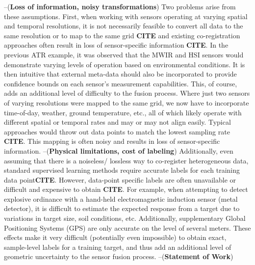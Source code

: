 \newline \vspace{1cm} \noindent --(\textbf{Loss of information, noisy transformations}) \newline
Two problems arise from these assumptions.  First, when working with sensors operating at varying spatial and temporal resolutions, it is not necessarily feasible to convert all data to the same resolution or to map to the same grid \textbf{CITE} and existing co-registration approaches often result in loss of sensor-specific information \textbf{CITE}.  In the previous ATR example, it was observed that the MWIR and HSI sensors would demonstrate varying levels of operation based on environmental conditions.  It is then intuitive that external meta-data should also be incorporated to provide confidence bounds on each sensor's measurement capabilities.  This, of course, adds an additional level of difficulty to the fusion process.  Where just two sensors of varying resolutions were mapped to the same grid, we now have to incorporate time-of-day, weather, ground temperature, etc., all of which likely operate with different spatial or temporal rates and may or may not align easily.  Typical approaches would throw out data points to match the lowest sampling rate \textbf{CITE}.  This mapping is often noisy and results in loss of sensor-specific information.
\newline 
\vspace{1cm}\noindent --(\textbf{Physical limitations, cost of labeling}) \newline
Additionally, even assuming that there is a noiseless/ lossless way to co-register heterogeneous data, standard supervised learning methods require accurate labels for each training data point\textbf{CITE}.  However, data-point specific labels are often unavailable or difficult and expensive to obtain \textbf{CITE}.  For example, when attempting to detect explosive ordinance with a hand-held electromagnetic induction sensor (metal detector), it is difficult to estimate the expected response from a target due to variations in target size, soil conditions, etc.   Additionally, supplementary Global Positioning Systems (GPS) are only accurate on the level of several meters. These effects make it very difficult (potentially even impossible) to obtain exact, sample-level labels for a training target, and thus add an additional level of geometric uncertainty to the sensor fusion process.  
\newline
\vspace{1cm}\noindent --(\textbf{Statement of Work}) \newline

